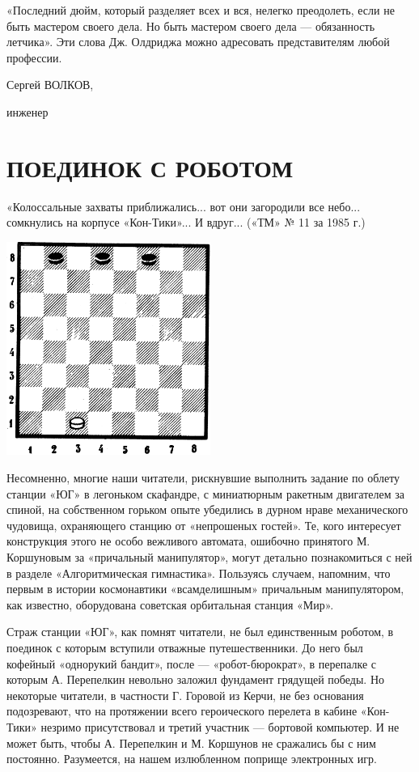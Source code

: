 \documentclass[11pt,a4paper,oneside]{article}
\begin{document}
«Последний дюйм, который разделяет всех и вся, нелегко преодолеть, если не быть мастером своего дела. Но быть мастером своего дела — обязанность летчика». Эти слова Дж. Олдриджа можно адресовать представителям любой профессии.

Сергей ВОЛКОВ,

инженер

\section{ПОЕДИНОК С РОБОТОМ}
«Колоссальные захваты приближались... вот они загородили все небо... сомкнулись на корпусе «Кон-Тики»... И вдруг... («ТМ» № 11 за 1985 г.)

\includegraphics[width=0.5\textwidth]{fight_with_robot}

Несомненно, многие наши читатели, рискнувшие выполнить задание по облету станции «ЮГ» в легоньком скафандре, с миниатюрным ракетным двигателем за спиной, на собственном горьком опыте убедились в дурном нраве механического чудовища, охраняющего станцию от «непрошеных гостей». Те, кого интересует конструкция этого не особо вежливого автомата, ошибочно принятого М. Коршуновым за «причальный манипулятор», могут детально познакомиться с ней в разделе «Алгоритмическая гимнастика». Пользуясь случаем, напомним, что первым в истории космонавтики «всамделишным» причальным манипулятором, как известно, оборудована советская орбитальная станция «Мир».

Страж станции «ЮГ», как помнят читатели, не был единственным роботом, в поединок с которым вступили отважные путешественники. До него был кофейный «однорукий бандит», после — «робот-бюрократ», в перепалке с которым А. Перепелкин невольно заложил фундамент грядущей победы. Но некоторые читатели, в частности Г. Горовой из Керчи, не без основания подозревают, что на протяжении всего героического перелета в кабине «Кон-Тики» незримо присутствовал и третий участник — бортовой компьютер. И не может быть, чтобы А. Перепелкин и М. Коршунов не сражались бы с ним постоянно. Разумеется, на нашем излюбленном поприще электронных игр.
\end{document}
